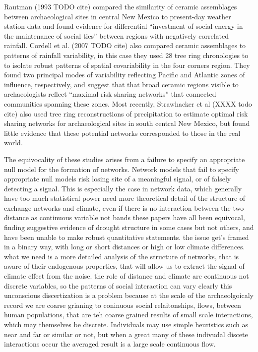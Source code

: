 \documentclass[fleqn,10pt]{wlscirep}
\begin{document}
Rautman (1993 TODO cite) compared the similarity of ceramic assemblages between archaeological sites in central New Mexico to present-day weather station data and found evidence for differential ``investment of social energy in the maintenance of social ties'' between regions with negatively correlated rainfall. Cordell et al. (2007 TODO cite) also compared ceramic assemblages to patterns of rainfall variability, in this case they used 28 tree ring chronologies to to isolate robust patterns of spatial covariability in the four corners region. They found two principal modes of variability reflecting Pacific and Atlantic zones of influence, respectively, and suggest that that broad ceramic regions visible to archaeologists reflect ``maximal risk sharing networks'' that connected communities spanning these zones. Most recently, Strawhacker et al (XXXX todo cite) also used tree ring reconstructions of precipitation to estimate optimal risk sharing networks for archaeological sites in south central New Mexico, but found little evidence that these potential networks corresponded to those in the real world.

 
 
 The equivocality of these studies arises from a failure to specify an appropriate null model for the formation of networks. Network models that fail to specify appropriate null models risk losing site of a meaningful signal, or of falsely detecting a signal. This is especially the case in network data, which generally have too much statistical power
 need more theoretical detail of the structure of exchange networks and climate, even if there is no interaction between the two
 distance as continuous variable not bands
 these papers have all been equivocal, finding suggestive evidence of drought structure in some cases but not others, and have been unable to make robust quantitative statements. the issue get's framed in a binary way, with long or short distances or high or low climate differences. what we need is a more detailed analysis of the structure of networks, that is aware of their endogenous properties, that will allow us to extract the signal of climate effect from the noise. the role of distance and climate are continuous not discrete variables, so the patterns of social interaction can vary clearly
 this unconscious discertization is a problem because at the scale of the archaeolgoicaly record we are coarse grianing to coninuous social relaitonships, flows, between human populations, that are teh coarse grained results of small scale interactions, which may themselves be discrete. Individuals may use simple heuristics such as near and far or similar or not, but when a great many of these indivudal discete interactions occur the averaged result is a large scale continuous flow.
\end{document}
